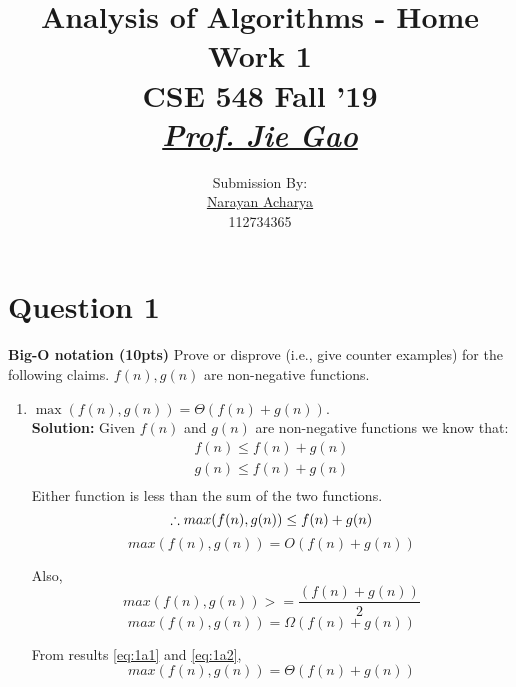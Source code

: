 \documentclass[11pt]{article}
\title{
	Analysis of Algorithms - Home Work 1\\[2mm]
	\large CSE 548 Fall '19\\[1mm]
	\href{mailto:jgao@cs.stonybrook.edu}{\textit{Prof. Jie Gao}}
}
\author{
	\small Submission By: \\
	\href{mailto:nacharya@cs.stonybrook.edu}{Narayan Acharya} \\
	\small 112734365
}
\date{\vspace{-5ex}}
\begin{document}
\maketitle
\thispagestyle{fancy} %

\section{Question 1}

\textbf{Big-O notation (10pts)} Prove or disprove (i.e., give counter examples) for the following claims. $f(n), g(n)$ are non-negative functions.
    \begin{enumerate}
    \item $\max(f(n), g(n))=\Theta(f(n)+g(n))$. \\
    \textbf{Solution:}
    Given $f(n)$ and $g(n)$ are non-negative functions we know that:
    \begin{equation*}
    \begin{split}
	    f(n) \le f(n) + g(n) \\
	    g(n) \le f(n) + g(n) \\
	\end{split}
    \end{equation*}
    Either function is less than the sum of the two functions.
    \begin{equation*} 
    \therefore max(f(n), g(n)) \le f(n) + g(n) \\
    \end{equation*}
    \begin{equation} \label{eq:1a1}
        \boxed{max(f(n), g(n)) = O(f(n)+g(n))}
    \end{equation}
    
    Also,
    \begin{equation*}
		max(f(n), g(n)) >= \frac{(f(n)+g(n))}{2}
    \end{equation*}
    \begin{equation} \label{eq:1a2}
	    \boxed{max(f(n), g(n)) = \Omega(f(n)+g(n))}
    \end{equation}
    
    From results \ref{eq:1a1} and \ref{eq:1a2},
    \begin{equation*}
	    \boxed{max(f(n), g(n)) = \Theta(f(n)+g(n))}
    \end{equation*}
    

\end{enumerate}
\end{document}
